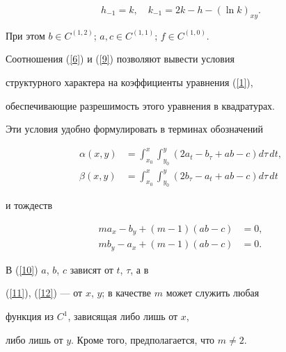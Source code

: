 \begin{equation}\label{9}


h_{-


1}=k,\quad k_{-1}=2k-h-(\ln k)_{xy}.


\end{equation}


При этом $b\in C^{(1,2)}$; $a, c\in C^{(1,1)}$; $f\in C^{(1,0)}$.





Соотношения (\ref{6}) и (\ref{9}) позволяют вывести условия


структурного характера на коэффициенты уравнения (\ref{1}),


обеспечивающие разрешимость этого уравнения в квадратурах.


Эти условия удобно формулировать в терминах обозначений


\begin{equation}\label{10}


\begin{split}


\alpha(x,y)&=\int_{x_{0}}^{x} \int_{y_{0}}^{y}


(2a_{t}-b_{\tau}+ab-c) d\tau\, dt, \\


\beta(x,y)&=\int_{x_{0}}^{x} \int_{y_{0}}^{y}


(2b_{\tau}-a_{t}+ab-c) d\tau\, dt


\end{split}


\end{equation}


и тождеств


\begin{align}\label{11}


ma_{x}-b_{y}+(m-1)(ab-c)&=0,\\


\label{12}


mb_{y}-a_{x}+(m-1)(ab-c)&=0.


\end{align}


В (\ref{10}) $a$, $b$, $c$ зависят от $t$, $\tau$, а в


(\ref{11}), (\ref{12}) --- от $x$, $y$; в качестве $m$ может служить любая


функция из $C^{1}$, зависящая либо лишь от $x$,


либо лишь от $y$. Кроме того, предполагается, что $m\ne2$.






